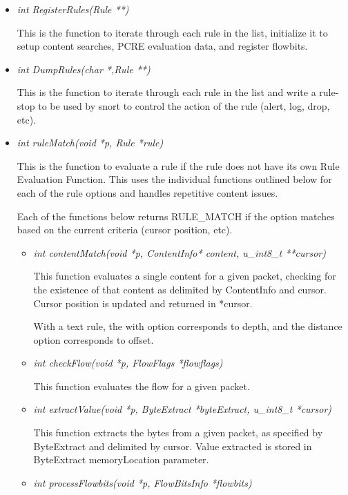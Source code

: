 \documentclass[english]{report}
\begin{document}
\begin{itemize}
\item {\em int RegisterRules(Rule **)}

This is the function to iterate through each rule in the list, initialize it to
setup content searches, PCRE evaluation data, and register flowbits.

\item {\em int DumpRules(char *,Rule **)}

This is the function to iterate through each rule in the list and write a
rule-stop to be used by snort to control the action of the rule (alert, log,
drop, etc).

\item {\em int ruleMatch(void *p, Rule *rule)}

This is the function to evaluate a rule if the rule does not have its own Rule
Evaluation Function.  This uses the individual functions outlined below for
each of the rule options and handles repetitive content issues.  

Each of the functions below returns RULE\_MATCH if the option matches based on
the current criteria (cursor position, etc).

\begin{itemize}

\item {\em int contentMatch(void *p, ContentInfo* content, u\_int8\_t **cursor)}

This function evaluates a single content for a given packet, checking for the
existence of that content as delimited by ContentInfo and cursor.  Cursor
position is updated and returned in *cursor.

With a text rule, the with option corresponds to depth, and the distance option
corresponds to offset.

\item {\em int checkFlow(void *p, FlowFlags *flowflags)}

This function evaluates the flow for a given packet.

\item {\em int extractValue(void *p, ByteExtract *byteExtract, u\_int8\_t *cursor)}

This function extracts the bytes from a given packet, as specified by
ByteExtract and delimited by cursor.  Value extracted is stored in ByteExtract
memoryLocation parameter.

\item {\em int processFlowbits(void *p, FlowBitsInfo *flowbits)}


\end{itemize}
\end{itemize}
\end{document}
